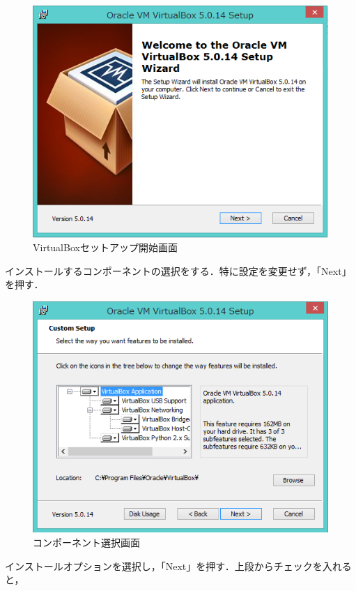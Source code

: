 \begin{figure}[H]
\centering
\includegraphics[width=13cm]{vboxinstall_welcome.PNG}
\caption{VirtualBoxセットアップ開始画面}\label{vboxinstallwelcome}
\end{figure}

インストールするコンポーネントの選択をする．特に設定を変更せず，「Next」を押す．

\begin{figure}[H]
\centering
\includegraphics[width=13cm]{vboxinstall_custom.PNG}
\caption{コンポーネント選択画面}\label{vboxinstallcustom}
\end{figure}

インストールオプションを選択し，「Next」を押す．上段からチェックを入れると，


